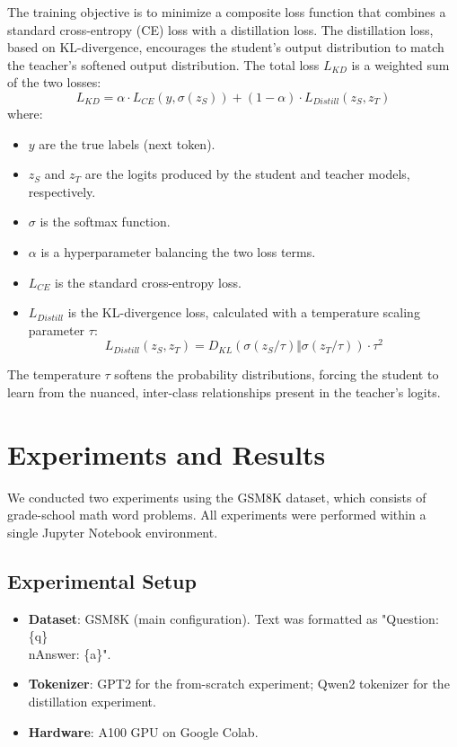 \documentclass[11pt,a4paper]{article}
\begin{document}
The training objective is to minimize a composite loss function that combines a standard cross-entropy (CE) loss with a distillation loss. The distillation loss, based on KL-divergence, encourages the student's output distribution to match the teacher's softened output distribution.
The total loss
$L_{KD}$ is a weighted sum of the two losses:
\begin{equation}
L_{KD} = \alpha \cdot L_{CE}(y, \sigma(z_S)) + (1 - \alpha) \cdot L_{Distill}(z_S, z_T)
\end{equation}
where:
\begin{itemize}
\item $y$ are the true labels (next token).
\item $z_S$ and $z_T$ are the logits produced by the student and teacher models, respectively.
\item $\sigma$ is the softmax function.
\item $\alpha$ is a hyperparameter balancing the two loss terms.
\item $L_{CE}$ is the standard cross-entropy loss.
\item $L_{Distill}$ is the KL-divergence loss, calculated with a temperature scaling parameter $\tau$:
\begin{equation}
L_{Distill}(z_S, z_T) = D_{KL}(\sigma(z_S/\tau) \Vert \sigma(z_T/\tau)) \cdot \tau^2
\end{equation}
\end{itemize}
The temperature $\tau$ softens the probability distributions, forcing the student to learn from the nuanced, inter-class relationships present in the teacher's logits.
\section{Experiments and Results}
We conducted two experiments using the GSM8K dataset, which consists of grade-school math word problems. All experiments were performed within a single Jupyter Notebook environment.
\subsection{Experimental Setup}
\begin{itemize}
\item \textbf{Dataset}: GSM8K (main configuration). Text was formatted as "Question: \{q\}\\nAnswer: \{a\}".
\item \textbf{Tokenizer}: GPT2 for the from-scratch experiment; Qwen2 tokenizer for the distillation experiment.
\item \textbf{Hardware}: A100 GPU on Google Colab.
\end{itemize}
\end{document}
